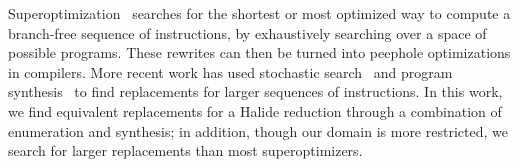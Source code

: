 Superoptimization~\cite{Granlund:1992:EBU:143095.143146, Massalin:1987:SLS:36206.36194} searches for the shortest or most optimized way to compute a branch-free sequence of instructions, by exhaustively searching over a space of possible programs. These rewrites can then be turned into peephole optimizations in compilers. More recent work has used stochastic search~\cite{Phothilimthana:2016:SUS:2872362.2872387, Schkufza:2013:SS:2490301.2451150} and program synthesis~\cite{Lopes:2015:PCP:2737924.2737965} to find replacements for larger sequences of instructions.
In this work, we find equivalent replacements for a Halide reduction through a combination of enumeration and synthesis; in addition, though our domain is more restricted, we search for larger replacements than most superoptimizers.

